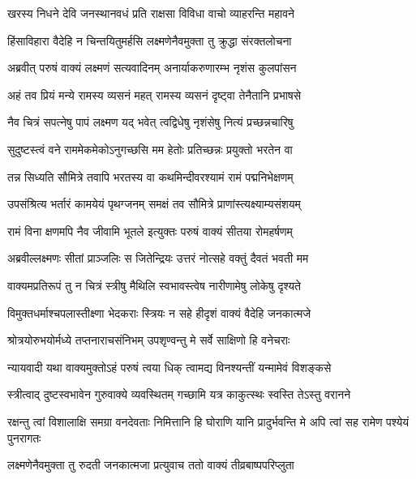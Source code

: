 \twolineshloka
{खरस्य निधने देवि जनस्थानवधं प्रति}
{राक्षसा विविधा वाचो व्याहरन्ति महावने} %

\twolineshloka
{हिंसाविहारा वैदेहि न चिन्तयितुमर्हसि}
{लक्ष्मणेनैवमुक्ता तु क्रुद्धा संरक्तलोचना} %

\twolineshloka
{अब्रवीत् परुषं वाक्यं लक्ष्मणं सत्यवादिनम्}
{अनार्याकरुणारम्भ नृशंस कुलपांसन} %

\twolineshloka
{अहं तव प्रियं मन्ये रामस्य व्यसनं महत्}
{रामस्य व्यसनं दृष्ट्वा तेनैतानि प्रभाषसे} %

\twolineshloka
{नैव चित्रं सपत्नेषु पापं लक्ष्मण यद् भवेत्}
{त्वद्विधेषु नृशंसेषु नित्यं प्रच्छन्नचारिषु} %

\twolineshloka
{सुदुष्टस्त्वं वने राममेकमेकोऽनुगच्छसि}
{मम हेतोः प्रतिच्छन्नः प्रयुक्तो भरतेन वा} %

\twolineshloka
{तन्न सिध्यति सौमित्रे तवापि भरतस्य वा}
{कथमिन्दीवरश्यामं रामं पद्मनिभेक्षणम्} %

\twolineshloka
{उपसंश्रित्य भर्तारं कामयेयं पृथग्जनम्}
{समक्षं तव सौमित्रे प्राणांस्त्यक्ष्याम्यसंशयम्} %

\twolineshloka
{रामं विना क्षणमपि नैव जीवामि भूतले}
{इत्युक्तः परुषं वाक्यं सीतया रोमहर्षणम्} %

\twolineshloka
{अब्रवील्लक्ष्मणः सीतां प्राञ्जलिः स जितेन्द्रियः}
{उत्तरं नोत्सहे वक्तुं दैवतं भवती मम} %

\twolineshloka
{वाक्यमप्रतिरूपं तु न चित्रं स्त्रीषु मैथिलि}
{स्वभावस्त्वेष नारीणामेषु लोकेषु दृश्यते} %

\twolineshloka
{विमुक्तधर्माश्चपलास्तीक्ष्णा भेदकराः स्त्रियः}
{न सहे हीदृशं वाक्यं वैदेहि जनकात्मजे} %

\twolineshloka
{श्रोत्रयोरुभयोर्मध्ये तप्तनाराचसंनिभम्}
{उपशृण्वन्तु मे सर्वे साक्षिणो हि वनेचराः} %

\twolineshloka
{न्यायवादी यथा वाक्यमुक्तोऽहं परुषं त्वया}
{धिक् त्वामद्य विनश्यन्तीं यन्मामेवं विशङ्कसे} %

\twolineshloka
{स्त्रीत्वाद् दुष्टस्वभावेन गुरुवाक्ये व्यवस्थितम्}
{गच्छामि यत्र काकुत्स्थः स्वस्ति तेऽस्तु वरानने} %

\threelineshloka
{रक्षन्तु त्वां विशालाक्षि समग्रा वनदेवताः}
{निमित्तानि हि घोराणि यानि प्रादुर्भवन्ति मे}
{अपि त्वां सह रामेण पश्येयं पुनरागतः} %

\twolineshloka
{लक्ष्मणेनैवमुक्ता तु रुदती जनकात्मजा}
{प्रत्युवाच ततो वाक्यं तीव्रबाष्पपरिप्लुता} %

